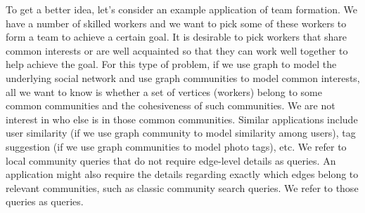 To get a better idea, let's consider an example application of team formation. We have a number of skilled workers and we want to pick some of these workers to form a team to achieve a certain goal. It is desirable to pick workers that share common interests or are well acquainted so that they can work well together to help achieve the goal. For this type of problem, if we use graph to model the underlying social network and use graph communities to model common interests, all we want to know is whether a set of vertices (workers) belong to some common communities and the cohesiveness of such communities. We are not interest in who else is in those common communities. Similar applications include user similarity (if we use graph community to model similarity among users), tag suggestion (if we use graph communities to model photo tags), etc. We refer to local community queries that do not require edge-level details as \toplevelprob{} queries. An application might also require the details regarding exactly which edges belong to relevant communities, such as classic community search queries. We refer to those queries as \bottomlevelprob{} queries.





